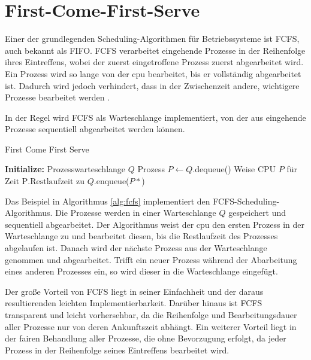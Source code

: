 
\section{First-Come-First-Serve}

Einer der grundlegenden Scheduling-Algorithmen für Betriebssysteme ist \ac{FCFS}, auch bekannt als \ac{FIFO}. \ac{FCFS} verarbeitet eingehende Prozesse in der Reihenfolge ihres Eintreffens, wobei der zuerst eingetroffene Prozess zuerst abgearbeitet wird. Ein Prozess wird so lange von der \ac{cpu} bearbeitet, bis er vollständig abgearbeitet ist.
Dadurch wird jedoch verhindert, dass in der Zwischenzeit andere, wichtigere Prozesse  bearbeitet werden \cite[Kapitel 2.3.1.7]{ANTHONY201621}.

In der Regel wird \ac{FCFS} als Warteschlange implementiert, von der aus eingehende Prozesse sequentiell abgearbeitet werden können.

\begin{algorithm}
    \caption{First Come First Serve } \label{alg:fcfs}
    \begin{algorithmic}[1]
        \State \textbf{Initialize:} Prozesswarteschlange $Q$
        \State Prozess $P \gets Q$.dequeue()
        \State Weise CPU $P$ für Zeit $\text{P.Restlaufzeit}$ zu
        \State $Q$.enqueue($P*$)
        \EndIf
        \EndWhile
    \end{algorithmic}
\end{algorithm}


Das Beispiel in Algorithmus \ref{alg:fcfs} implementiert den \ac{FCFS}-Scheduling-Algorithmus. Die Prozesse werden in einer Warteschlange $Q$ gespeichert und sequentiell abgearbeitet. Der Algorithmus weist der \ac{cpu} den ersten Prozess in der Warteschlange zu und bearbeitet diesen, bis die Restlaufzeit des Prozesses abgelaufen ist. Danach wird der nächste Prozess aus der Warteschlange genommen und abgearbeitet. Trifft ein neuer Prozess während der Abarbeitung eines anderen Prozesses ein, so wird dieser in die Warteschlange eingefügt.

Der große Vorteil von \ac{FCFS} liegt in seiner Einfachheit und der daraus resultierenden leichten Implementierbarkeit. Darüber hinaus ist \ac{FCFS} transparent und leicht vorhersehbar, da die Reihenfolge und Bearbeitungsdauer aller Prozesse nur von deren Ankunftszeit abhängt. Ein weiterer Vorteil liegt in der fairen Behandlung aller Prozesse, die ohne Bevorzugung erfolgt, da jeder Prozess in der Reihenfolge seines Eintreffens bearbeitet wird.

